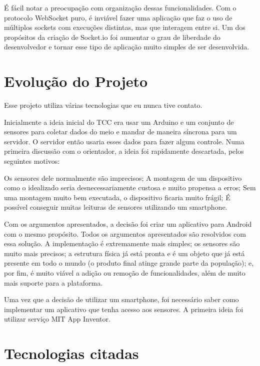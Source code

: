 \documentclass[a4paper,12pt]{article}
\begin{document}
É fácil notar a preocupação com organização dessas funcionalidades. Com o protocolo WebSocket puro, é inviável fazer uma aplicação que faz o uso de múltiplos sockets com execuções distintas, mas que interagem entre si. Um dos propósitos da criação de Socket.io foi aumentar o grau de liberdade do desenvolvedor e tornar esse tipo de aplicação muito simples de ser desenvolvida.

\newpage

\section{Evolução do Projeto}

Esse projeto utiliza várias tecnologias que eu nunca tive contato.


Inicialmente a ideia inicial do TCC era usar um Arduino e um conjunto de sensores para coletar dados do meio e mandar de maneira síncrona para um servidor. O servidor então usaria esses dados para fazer algum controle. Numa primeira discussão com o orientador, a ideia foi rapidamente descartada, pelos seguintes motivos:

Os sensores dele normalmente são imprecisos;
A montagem de um dispositivo como o idealizado seria desnecessariamente custosa e muito propensa a erros;
Sem uma montagem muito bem executada, o dispositivo ficaria muito frágil;
É possível conseguir muitas leituras de sensores utilizando um smartphone.


Com os argumentos apresentados, a decisão foi criar um aplicativo para Android com o mesmo propósito. Todos os argumentos apresentados são resolvidos com essa solução. A implementação é extremamente mais simples; os sensores são muito mais precisos; a estrutura física já está pronta e é um objeto que já está presente em todo o mundo (o produto final atinge grande parte da população); e, por fim, é muito viável a adição ou remoção de funcionalidades, além de muito mais suporte para a plataforma.


Uma vez que a decisão de utilizar um smartphone, foi necessário saber como implementar um aplicativo que tenha acesso aos sensores.
A primeira ideia foi utilizar serviço MIT App Inventor.





\section{Tecnologias citadas}
\end{document}

